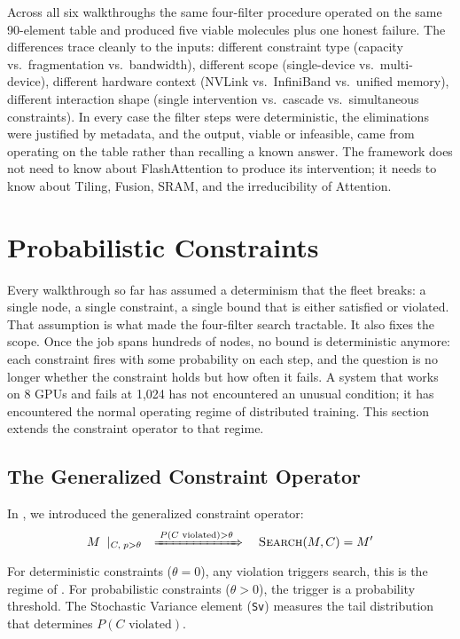 \documentclass[10pt,twocolumn]{article}
\begin{document}
Across all six walkthroughs the same four-filter procedure operated on the same 90-element table and produced five viable molecules plus one honest failure. The differences trace cleanly to the inputs: different constraint type (capacity vs.\ fragmentation vs.\ bandwidth), different scope (single-device vs.\ multi-device), different hardware context (NVLink vs.\ InfiniBand vs.\ unified memory), different interaction shape (single intervention vs.\ cascade vs.\ simultaneous constraints). In every case the filter steps were deterministic, the eliminations were justified by metadata, and the output, viable or infeasible, came from operating on the table rather than recalling a known answer. The framework does not need to know about FlashAttention to produce its intervention; it needs to know about Tiling, Fusion, SRAM, and the irreducibility of Attention.

\section{Probabilistic Constraints}
\label{sec:probabilistic}

Every walkthrough so far has assumed a determinism that the fleet breaks: a single node, a single constraint, a single bound that is either satisfied or violated. That assumption is what made the four-filter search tractable. It also fixes the scope. Once the job spans hundreds of nodes, no bound is deterministic anymore: each constraint fires with some probability on each step, and the question is no longer whether the constraint holds but how often it fails. A system that works on 8 GPUs and fails at 1{,}024 has not encountered an unusual condition; it has encountered the normal operating regime of distributed training. This section extends the constraint operator to that regime.

\subsection{The Generalized Constraint Operator}

In , we introduced the generalized constraint operator:
\begin{equation}
M \;\mid_{C,\; p > \theta} \quad \xRightarrow{\;P(C\text{ violated}) > \theta\;} \quad \text{\textsc{Search}}(M, C) = M'
\end{equation}
For deterministic constraints ($\theta = 0$), any violation triggers search, this is the regime of . For probabilistic constraints ($\theta > 0$), the trigger is a probability threshold. The Stochastic Variance element (\texttt{Sv}) measures the tail distribution that determines $P(C\text{ violated})$.
\end{document}
